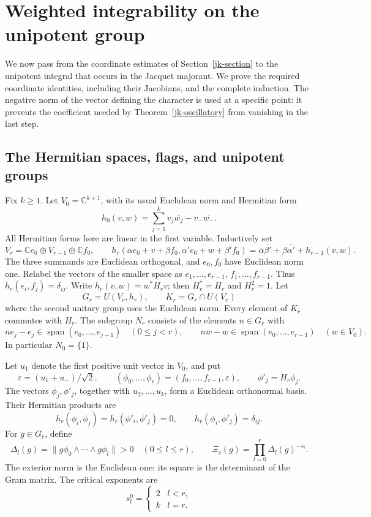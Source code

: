 \section{Weighted integrability on the unipotent group}
\label{ju-section}

We now pass from the coordinate estimates of
Section~\ref{jk-section} to the unipotent integral that occurs in
the Jacquet majorant.  We prove the required coordinate identities,
including their Jacobians, and the complete induction.
The negative norm of the vector defining the character is used at
a specific point: it prevents the coefficient needed by
Theorem~\ref{jk-oscillatory} from vanishing in the last step.

\subsection{The Hermitian spaces, flags, and unipotent groups}

Fix \(k\geq1\).  Let \(V_0=\mathbb C^{k+1}\), with its usual
Euclidean norm and Hermitian form
\[
 h_0(v,w)=\sum_{j=1}^{k}v_j\overline{w_j}
                         -v_-\overline{w_-}.
\]
All Hermitian forms here are linear in the first variable.
Inductively set
\[
 V_r=\mathbb Ce_0\oplus V_{r-1}\oplus\mathbb Cf_0,\qquad
 h_r(\alpha e_0+v+\beta f_0,\alpha'e_0+w+\beta'f_0)
       =\alpha\overline{\beta'}+\beta\overline{\alpha'}
                                      +h_{r-1}(v,w).
\]
The three summands are Euclidean orthogonal, and \(e_0,f_0\)
have Euclidean norm one.  Relabel the vectors of the smaller
space as \(e_1,\ldots,e_{r-1}\), \(f_1,\ldots,f_{r-1}\).
Thus \(h_r(e_i,f_j)=\delta_{ij}\).
Write \(h_r(v,w)=w^*H_rv\); then \(H_r^*=H_r\) and \(H_r^2=1\).
Let
\[
 G_r=U(V_r,h_r),\qquad K_r=G_r\cap U(V_r)
\]
where the second unitary group uses the Euclidean norm.
Every element of \(K_r\) commutes with \(H_r\).
The subgroup \(N_r\) consists of the elements \(n\in G_r\) with
\[
 ne_j-e_j\in\operatorname{span}(e_0,\ldots,e_{j-1})
                 \quad(0\leq j<r),\qquad
 nw-w\in\operatorname{span}(e_0,\ldots,e_{r-1})
                 \quad(w\in V_0).
\]
In particular \(N_0=\{1\}\).

Let \(u_1\) denote the first positive unit vector in \(V_0\),
and put
\[
 \varepsilon=(u_1+u_-)/\sqrt2,\qquad
 (\phi_0,\ldots,\phi_r)=(f_0,\ldots,f_{r-1},\varepsilon),
 \qquad \phi'_j=H_r\phi_j .
\]
The vectors \(\phi_j,\phi'_j\), together with
\(u_2,\ldots,u_k\), form a Euclidean orthonormal basis.
Their Hermitian products are
\[
 h_r(\phi_i,\phi_j)=h_r(\phi'_i,\phi'_j)=0,\qquad
 h_r(\phi_i,\phi'_j)=\delta_{ij}.
\]
For \(g\in G_r\), define
\[
 \Delta_l(g)=
       \|g\phi_0\wedge\cdots\wedge g\phi_l\|>0
                         \quad(0\leq l\leq r),
 \qquad
 \Xi_s(g)=\prod_{l=0}^{r}\Delta_l(g)^{-s_l}.
\]
The exterior norm is the Euclidean one: its square is the
determinant of the Gram matrix.
The critical exponents are
\[
 s_l^0=\begin{cases}2&l<r,\\k&l=r.\end{cases}
\]

